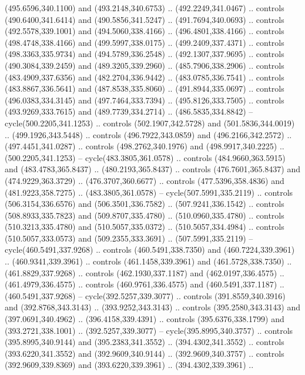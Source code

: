 \begin{scope}[cm={{1.25,0.0,0.0,-1.25,(0.0,743.43331)}}]
    (495.6596,340.1100) and (493.2148,340.6753) .. (492.2249,341.0467) .. controls
    (490.6400,341.6414) and (490.5856,341.5247) .. (491.7694,340.0693) .. controls
    (492.5578,339.1001) and (494.5060,338.4166) .. (496.4801,338.4166) .. controls
    (498.4748,338.4166) and (499.5997,338.0175) .. (499.2409,337.4371) .. controls
    (498.3363,335.9734) and (494.5789,336.2548) .. (492.1307,337.9695) .. controls
    (490.3084,339.2459) and (489.3205,339.2960) .. (485.7906,338.2906) .. controls
    (483.4909,337.6356) and (482.2704,336.9442) .. (483.0785,336.7541) .. controls
    (483.8867,336.5641) and (487.8538,335.8060) .. (491.8944,335.0697) .. controls
    (496.0383,334.3145) and (497.7464,333.7394) .. (495.8126,333.7505) .. controls
    (493.9269,333.7615) and (489.7739,334.2714) .. (486.5835,334.8842) --
    cycle(500.2205,341.1253) .. controls (502.1907,342.5728) and
    (501.5836,344.0019) .. (499.1926,343.5448) .. controls (496.7922,343.0859) and
    (496.2166,342.2572) .. (497.4451,341.0287) .. controls (498.2762,340.1976) and
    (498.9917,340.2225) .. (500.2205,341.1253) -- cycle(483.3805,361.0578) ..
    controls (484.9660,363.5915) and (483.4783,365.8437) .. (480.2193,365.8437) ..
    controls (476.7601,365.8437) and (474.9229,363.3729) .. (476.3707,360.6677) ..
    controls (477.5396,358.4836) and (481.9223,358.7275) .. (483.3805,361.0578) --
    cycle(507.5991,335.2119) .. controls (506.3154,336.6576) and
    (506.3501,336.7582) .. (507.9241,336.1542) .. controls (508.8933,335.7823) and
    (509.8707,335.4780) .. (510.0960,335.4780) .. controls (510.3213,335.4780) and
    (510.5057,335.0372) .. (510.5057,334.4984) .. controls (510.5057,333.0573) and
    (509.2355,333.3691) .. (507.5991,335.2119) -- cycle(460.5491,337.9268) ..
    controls (460.5491,338.7350) and (460.7224,339.3961) .. (460.9341,339.3961) ..
    controls (461.1458,339.3961) and (461.5728,338.7350) .. (461.8829,337.9268) ..
    controls (462.1930,337.1187) and (462.0197,336.4575) .. (461.4979,336.4575) ..
    controls (460.9761,336.4575) and (460.5491,337.1187) .. (460.5491,337.9268) --
    cycle(392.5257,339.3077) .. controls (391.8559,340.3916) and
    (392.8768,343.3143) .. (393.9252,343.3143) .. controls (395.2580,343.3143) and
    (397.0691,340.4962) .. (396.4158,339.4391) .. controls (395.6376,338.1799) and
    (393.2721,338.1001) .. (392.5257,339.3077) -- cycle(395.8995,340.3757) ..
    controls (395.8995,340.9144) and (395.2383,341.3552) .. (394.4302,341.3552) ..
    controls (393.6220,341.3552) and (392.9609,340.9144) .. (392.9609,340.3757) ..
    controls (392.9609,339.8369) and (393.6220,339.3961) .. (394.4302,339.3961) ..

\end{scope}
